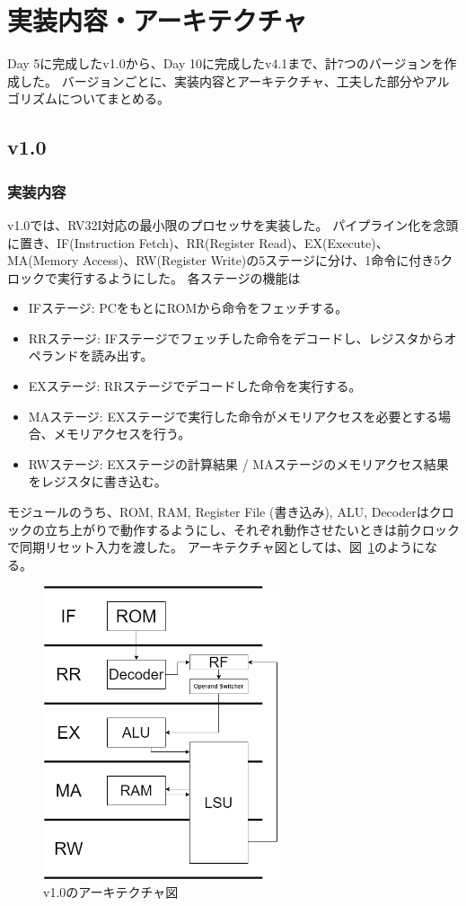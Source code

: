 \documentclass[dvipdfmx,10pt,a4paper,titlepage]{jsarticle}
\begin{document}
    \section{実装内容・アーキテクチャ}
    Day 5に完成したv1.0から、Day 10に完成したv4.1まで、計7つのバージョンを作成した。
    バージョンごとに、実装内容とアーキテクチャ、工夫した部分やアルゴリズムについてまとめる。
    \subsection{v1.0}
    \subsubsection{実装内容}
    v1.0では、RV32I対応の最小限のプロセッサを実装した。
    パイプライン化を念頭に置き、IF(Instruction Fetch)、RR(Register Read)、EX(Execute)、MA(Memory Access)、RW(Register Write)の5ステージに分け、1命令に付き5クロックで実行するようにした。
    各ステージの機能は
    \begin{itemize}
        \item IFステージ: PCをもとにROMから命令をフェッチする。
        \item RRステージ: IFステージでフェッチした命令をデコードし、レジスタからオペランドを読み出す。
        \item EXステージ: RRステージでデコードした命令を実行する。
        \item MAステージ: EXステージで実行した命令がメモリアクセスを必要とする場合、メモリアクセスを行う。
        \item RWステージ: EXステージの計算結果 / MAステージのメモリアクセス結果をレジスタに書き込む。
    \end{itemize}
    モジュールのうち、ROM, RAM, Register File (書き込み), ALU, Decoderはクロックの立ち上がりで動作するようにし、それぞれ動作させたいときは前クロックで同期リセット入力を渡した。
    アーキテクチャ図としては、図~\ref{fig:v1.0}のようになる。
    \begin{figure}[h]
        \centering
        \includegraphics[width=7cm]{figure/v1.0.png}
        \caption{v1.0のアーキテクチャ図}\label{fig:v1.0}
    \end{figure}
\end{document}
